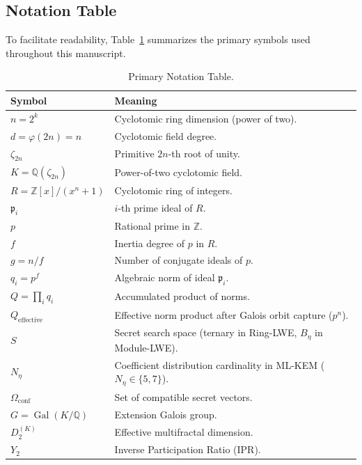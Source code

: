 \documentclass[11pt,a4paper]{article}
\theoremstyle{plain}
\theoremstyle{definition}
\numberwithin{equation}{section}
\newcommand{\QQ}{\mathbb{Q}}
\newcommand{\ZZ}{\mathbb{Z}}
\newcommand{\fkp}{\mathfrak{p}}
\newcommand{\Gal}{\operatorname{Gal}}
\begin{document}
\subsection{Notation Table}
To facilitate readability, Table~\ref{tab:notacion} summarizes the primary symbols used throughout this manuscript.

\begin{table}[htbp]
\centering
\small
\caption{Primary Notation Table.}
\label{tab:notacion}
\begin{tabular}{l p{10cm}}
\toprule
\textbf{Symbol} & \textbf{Meaning} \\
\midrule
$n = 2^k$ & Cyclotomic ring dimension (power of two). \\
$d = \varphi(2n) = n$ & Cyclotomic field degree. \\
$\zeta_{2n}$ & Primitive $2n$-th root of unity. \\
$K = \QQ(\zeta_{2n})$ & Power-of-two cyclotomic field. \\
$R = \ZZ[x]/(x^n+1)$ & Cyclotomic ring of integers. \\
$\fkp_i$ & $i$-th prime ideal of $R$. \\
$p$ & Rational prime in $\ZZ$. \\
$f$ & Inertia degree of $p$ in $R$. \\
$g = n/f$ & Number of conjugate ideals of $p$. \\
$q_i = p^f$ & Algebraic norm of ideal $\fkp_i$. \\
$Q = \prod_i q_i$ & Accumulated product of norms. \\
$Q_{\text{effective}}$ & Effective norm product after Galois orbit capture ($p^n$). \\
$S$ & Secret search space (ternary in Ring-LWE, $B_\eta$ in Module-LWE). \\
$N_\eta$ & Coefficient distribution cardinality in ML-KEM ($N_\eta \in \{5, 7\}$). \\
$\Omega_{\text{conf}}$ & Set of compatible secret vectors. \\
$G = \Gal(K/\QQ)$ & Extension Galois group. \\
$D_2^{(K)}$ & Effective multifractal dimension. \\
$Y_2$ & Inverse Participation Ratio (IPR). \\
\bottomrule
\end{tabular}
\end{table}

\end{document}
